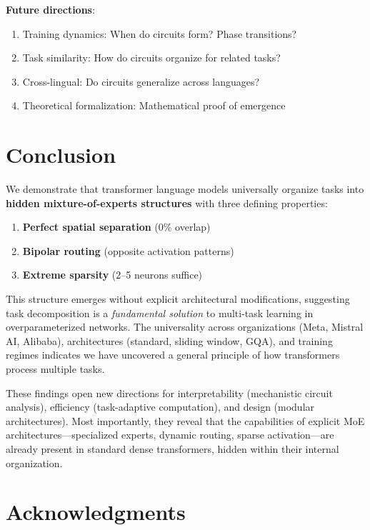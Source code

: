 \documentclass{article}
\begin{document}
\textbf{Future directions}:
\begin{enumerate}
    \item Training dynamics: When do circuits form? Phase transitions?
    \item Task similarity: How do circuits organize for related tasks?
    \item Cross-lingual: Do circuits generalize across languages?
    \item Theoretical formalization: Mathematical proof of emergence
\end{enumerate}

\section{Conclusion}

We demonstrate that transformer language models universally organize tasks into \textbf{hidden mixture-of-experts structures} with three defining properties:

\begin{enumerate}
    \item \textbf{Perfect spatial separation} (0\% overlap)
    \item \textbf{Bipolar routing} (opposite activation patterns)
    \item \textbf{Extreme sparsity} (2--5 neurons suffice)
\end{enumerate}

This structure emerges without explicit architectural modifications, suggesting task decomposition is a \textit{fundamental solution} to multi-task learning in overparameterized networks. The universality across organizations (Meta, Mistral AI, Alibaba), architectures (standard, sliding window, GQA), and training regimes indicates we have uncovered a general principle of how transformers process multiple tasks.

These findings open new directions for interpretability (mechanistic circuit analysis), efficiency (task-adaptive computation), and design (modular architectures). Most importantly, they reveal that the capabilities of explicit MoE architectures—specialized experts, dynamic routing, sparse activation—are already present in standard dense transformers, hidden within their internal organization.

\section*{Acknowledgments}
\end{document}
